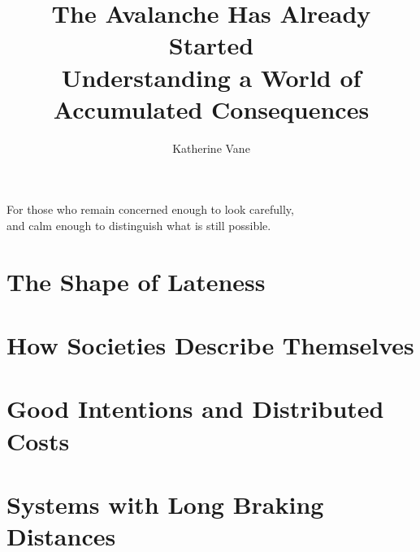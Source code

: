 \documentclass[12pt,a4paper]{book}
\title{The Avalanche Has Already Started\\[0.6em]
\large Understanding a World of Accumulated Consequences}
\author{Katherine Vane}
\date{}
\begin{document}
\frontmatter
\maketitle

\thispagestyle{empty}
\vspace*{\fill}
\begin{center}
For those who remain concerned enough to look carefully,\\
and calm enough to distinguish what is still possible.
\end{center}
\vspace*{\fill}
\clearpage

\tableofcontents




\mainmatter

\part{The Shape of Lateness}






\part{How Societies Describe Themselves}






\part{Good Intentions and Distributed Costs}






\part{Systems with Long Braking Distances}





\end{document}

